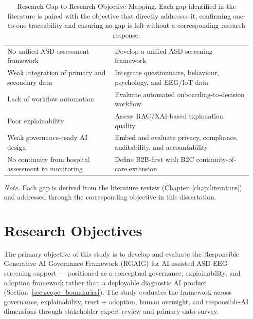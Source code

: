 {\tablestripes\tablefontsize
{}
\begin{xltabular}{\textwidth}{@{} L L @{}}
\caption[Research Gap to Research Objective Mapping]{Research Gap to Research Objective Mapping. Each gap identified in the literature is paired with the objective that directly addresses it, confirming one-to-one traceability and ensuring no gap is left without a corresponding research response.}\label{tab:gap_to_objective} \\
\toprule
{} &  \\
\midrule
\endfirsthead
\endhead
\bottomrule
\endlastfoot
No unified ASD assessment framework & Develop a unified ASD screening framework \\
Weak integration of primary and secondary data & Integrate questionnaire, behaviour, psychology, and EEG/IoT data \\
Lack of workflow automation & Evaluate automated onboarding-to-decision workflow \\
Poor explainability & Assess RAG/XAI-based explanation quality \\
Weak governance-ready AI design & Embed and evaluate privacy, compliance, auditability, and accountability \\
No continuity from hospital assessment to monitoring & Define B2B-first with B2C continuity-of-care extension \\
\end{xltabular}}
\vspace{2pt}
\noindent\textit{Note.} Each gap is derived from the literature review (Chapter~\ref{chap:literature}) and addressed through the corresponding objective in this dissertation.

\section{Research Objectives}
\label{sec:research_purpose}

The primary objective of this study is to develop and evaluate the Responsible Generative AI Governance Framework (RGAIG) for AI-assisted ASD-EEG screening support — positioned as a conceptual governance, explainability, and adoption framework rather than a deployable diagnostic AI product (Section~\ref{sec:scope_boundaries}). The study evaluates the framework across governance, explainability, trust + adoption, human oversight, and responsible-AI dimensions through stakeholder expert review and primary-data survey.

